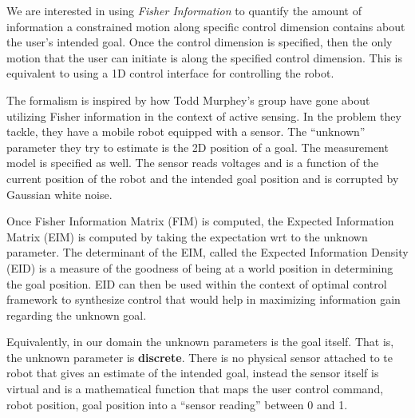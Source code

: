\documentclass[]{article}
\begin{document}
 \noindent We are interested in using \textit{Fisher Information} to quantify the amount of information a constrained motion along specific control dimension contains about the user's intended goal. Once the control dimension is specified, then the only motion that the user can initiate is along the specified control dimension. This is equivalent to using a 1D control interface for controlling the robot. 
 
 \noindent The formalism is inspired by how Todd Murphey's group have gone about utilizing Fisher information in the context of active sensing. In the problem they tackle, they have a mobile robot equipped with a sensor. The ``unknown'' parameter they try to estimate is the 2D position of a goal. The measurement model is specified as well. The sensor reads voltages and is a function of the current position of the robot and the intended goal position and is corrupted by Gaussian white noise. 
 
 \noindent Once Fisher Information Matrix (FIM) is computed, the Expected Information Matrix (EIM) is computed by taking the expectation wrt to the unknown parameter. The determinant of the EIM, called the Expected Information Density (EID) is a measure of the goodness of being at a world position in determining the goal position. EID can then be used within the context of optimal control framework to synthesize control that would help in maximizing information gain regarding the unknown goal. 
 
 \noindent Equivalently, in our domain the unknown parameters is the goal itself. That is, the unknown parameter is \textbf{discrete}. There is no physical sensor attached to te robot that gives an estimate of the intended goal, instead the sensor itself is virtual and is a mathematical function that maps the user control command, robot position, goal position into a ``sensor reading'' between 0 and 1. 
 
\end{document}
